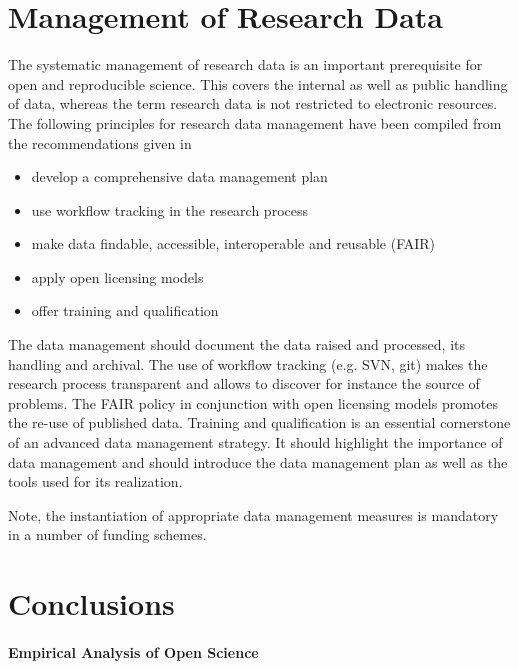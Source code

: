 \documentclass[a4paper, 10pt, twocolumn]{article}
\begin{document}
\section*{Management of Research Data} \label{sec:data_management}

The systematic management of research data is an important prerequisite for open and 
reproducible science. This covers the internal as well as public handling of data, whereas
the term research data is not restricted to electronic resources. The following principles
for research data management have been compiled from the recommendations given 
in~\cite{DFG_GWP:Book,HRK_FDM:WWW,Stodden2014:JORS,H2020_FAIR:ERC}
\begin{itemize}
\item develop a comprehensive data management plan
\item use workflow tracking in the research process
\item make data findable, accessible, interoperable and reusable (FAIR)~\cite{H2020_FAIR:ERC}
\item apply open licensing models
\item offer training and qualification
\end{itemize}
The data management should document the data raised and processed, its handling and
archival. The use of workflow tracking (e.g. SVN, git) makes the research process transparent 
and allows to discover for instance the source of problems. The FAIR policy in conjunction with
open licensing models promotes the re-use of published data. Training and qualification is an
essential cornerstone of an advanced data management strategy. It should highlight the importance
of data management and should introduce the data management plan as well as the tools used for
its realization.

Note, the instantiation of appropriate data management measures is mandatory in a number 
of funding schemes.


\section*{Conclusions} \label{sec:conclusions} 

\paragraph*{Empirical Analysis of Open Science}
\end{document}
